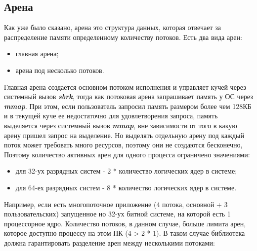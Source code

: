 \subsection{Арена}
Как уже было сказано, арена это структура данных, которая отвечает за распределение памяти определенному количеству потоков\cite{arena}. Есть два вида арен:
\begin{itemize}
	\item главная арена;
	\item арена под несколько потоков.
\end{itemize}
Главная арена создается основном потоком исполнения и управляет кучей через системный вызов \textbf{\textit{sbrk}}, тогда как потоковая арена запрашивает память у ОС через \textbf{\textit{mmap}}. При этом, если пользователь запросил память размером более чем 128КБ и в текущей куче ее недостаточно для удовлетворения запроса, память выделяется через системный вызов \textbf{\textit{mmap}}, вне зависимости от того в какую арену пришел запрос на выделение. Но выделять отдельную арену под каждый поток может требовать много ресурсов, поэтому они не создаются бесконечно, Поэтому количество активных арен для одного процесса ограничено значениями:
\begin{itemize}
	\item для 32-ух разрядных систем - 2 * количество логических ядер в системе;
	\item для 64-ех разрядных систем - 8 * количество логических ядер в системе.
\end{itemize}
Например, если есть многопоточное приложение (4 потока, основной + 3 пользовательских) запущенное но 32-ух битной системе, на которой есть 1 процессорное ядро. Количество потоков, в данном случае, больше лимита арен, которое доступно процессу на этом ПК (4 > 2 * 1). В таком случае библиотека должна гарантировать разделение арен между несколькими потоками:

